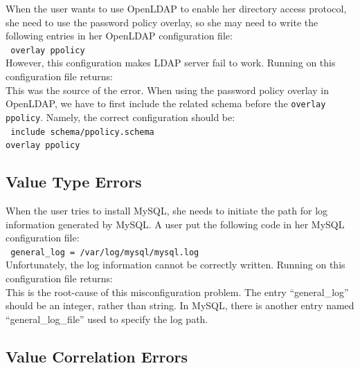 When the user wants to use OpenLDAP to enable her directory access
protocol, she need to use the password policy overlay, so she may need
to write the following entries in her OpenLDAP configuration file:\\
\texttt{
 \hspace*{3em}overlay ppolicy\\}
However, this configuration makes LDAP server fail to work.
Running \app on this configuration file returns:
\\
This was the source of the error. When using the password policy overlay
in OpenLDAP, we have to first include the related schema before the
{\tt overlay ppolicy}. Namely, the correct configuration should be:\\
\texttt{
 \hspace*{3em}include schema/ppolicy.schema\\
 \hspace*{3em}overlay ppolicy\\
}

\subsection{Value Type Errors}

When the user tries to install MySQL, she needs to initiate the path for
log information generated by MySQL. A user put the following code in 
her MySQL configuration file:\\
\texttt{
 \hspace*{3em}general\_log = /var/log/mysql/mysql.log\\}
Unfortunately, the log information cannot be correctly written.
Running \app on this configuration file returns:
\\
This is the root-cause of this misconfiguration problem. 
The entry ``general\_log'' should be an integer, 
rather than string. In MySQL, there is another entry named
``general\_log\_file'' used to specify the log path.  

\subsection{Value Correlation Errors}

